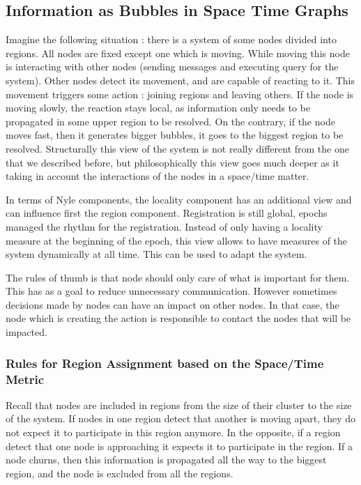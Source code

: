 \documentclass[a4paper,11pt,oneside]{report}
\begin{document}
\subsection{Information as Bubbles in Space Time Graphs}

Imagine the following situation : there is a system of some nodes divided into
regions. All nodes are fixed except one which is moving. While moving this node
is interacting with other nodes (sending messages and executing query for the
system). Other nodes detect its movement, and are capable of reacting to it.
This movement triggers some action : joining regions and leaving others. If the
node is moving slowly, the reaction stays local, as information only needs to
be propagated in some upper region to be resolved. On the contrary, if the node
moves fast, then it generates bigger bubbles, it goes to the biggest region to
be resolved.  Structurally this view of the system is not really different from
the one that we described before, but philosophically this view goes much
deeper as it taking in account the interactions of the nodes in a space/time
matter. 

In terms of Nyle components, the locality component has an additional view and
can influence first the region component. Registration is still global, epochs
managed the rhythm for the registration. Instead of only having a locality
measure at the beginning of the epoch, this view allows to have measures of the
system dynamically at all time. 
This can be used to adapt the system.

The rules of thumb is that node should only care of what is important for them.
This has as a goal to reduce unnecessary communication. However sometimes
decisions made by nodes can have an impact on other nodes. In that case, the
node which is creating the action is responsible to contact the nodes that will
be impacted.

\subsubsection{Rules for Region Assignment based on the Space/Time Metric}
Recall that nodes are included in regions from the size of their cluster to the
size of the system.  If nodes in one region detect that another is moving
apart, they do not expect it to participate in this region anymore. In the
opposite, if a region detect that one node is approaching it expects it to
participate in the region.  If a node churns, then this information is
propagated all the way to the biggest region, and the node is excluded from all
the regions. 
\end{document}
